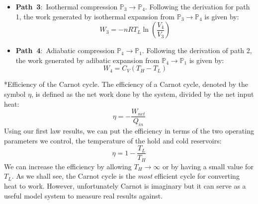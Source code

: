 \documentclass[11pt]{article}
\makeatletter
\theoremstyle{definition}
\renewcommand\subsection{\@startsection
	{subsection}{2}{0mm}
	{-0.05in}
	{0.5\baselineskip}
	{\normalfont\normalsize\bfseries}}
\makeatother
\begin{document}
\begin{itemize}
\item{\textbf{Path~3}:~Isothermal compression $\mathbb{P}_{3}\rightarrow\mathbb{P}_{4}$.
Following the derivation for path 1, the work generated by isothermal expansion from $\mathbb{P}_{3}\rightarrow\mathbb{P}_{4}$ is given by:
\begin{equation}
W_{3} = - nRT_{L}\ln\left(\frac{V_{4}}{V_{3}}\right)
\end{equation}}

\item{\textbf{Path~4}:~Adiabatic compression $\mathbb{P}_{4}\rightarrow\mathbb{P}_{1}$.
Following the derivation of path 2, the work generated by adibatic expansion from $\mathbb{P}_{4}\rightarrow\mathbb{P}_{1}$ is given by:
\begin{equation}
W_{4} = C_{V}\left(T_{H} - T_{L}\right)
\end{equation}}
\end{itemize}

\subsection*{Efficiency of the Carnot cycle.}
The efficiency of a Carnot cycle, denoted by the symbol $\eta$, is defined as the net work done by the system, divided by the net input heat:
\begin{equation}
\eta = -\frac{W_{net}}{Q_{in}}
\end{equation}Using our first law results, we can put the efficiency in terms of the two operating parameters we control, the temperature of the
hold and cold reservoirs:
\begin{equation}\label{eqn:carnot-efficinecy}
\eta = 1 - \frac{T_{L}}{T_{H}}
\end{equation}We can increase the efficiency by allowing $T_{H}\rightarrow\infty$ or by having a small value for $T_{L}$.
As we shall see, the Carnot cycle is the \textit{most} efficient cycle for converting heat to work.
However, unfortunately Carnot is imaginary but it can serve as a useful model system to measure real results against.
\end{document}

